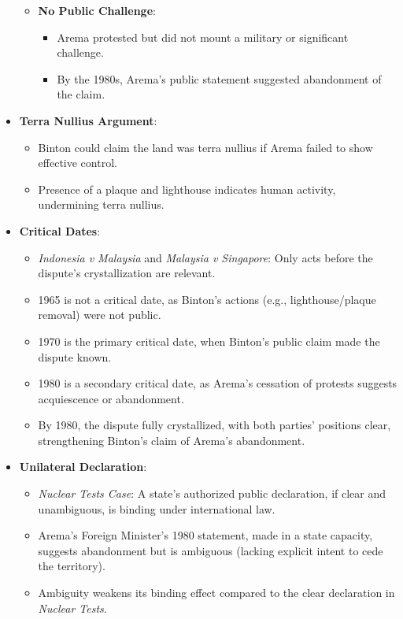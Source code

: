 \begin{itemize}
\begin{itemize}
        \item \textbf{No Public Challenge}:
        \begin{itemize}
            \item Arema protested but did not mount a military or significant challenge.
            \item By the 1980s, Arema’s public statement suggested abandonment of the claim.
        \end{itemize}
    \end{itemize}
    \item \textbf{Terra Nullius Argument}:
    \begin{itemize}
        \item Binton could claim the land was terra nullius if Arema failed to show effective control.
        \item Presence of a plaque and lighthouse indicates human activity, undermining terra nullius.
    \end{itemize}
    \item \textbf{Critical Dates}:
    \begin{itemize}
        \item \textit{Indonesia v Malaysia} and \textit{Malaysia v Singapore}: Only acts before the dispute’s crystallization are relevant.
        \item 1965 is not a critical date, as Binton’s actions (e.g., lighthouse/plaque removal) were not public.
        \item 1970 is the primary critical date, when Binton’s public claim made the dispute known.
        \item 1980 is a secondary critical date, as Arema’s cessation of protests suggests acquiescence or abandonment.
        \item By 1980, the dispute fully crystallized, with both parties’ positions clear, strengthening Binton’s claim of Arema’s abandonment.
    \end{itemize}
    \item \textbf{Unilateral Declaration}:
    \begin{itemize}
        \item \textit{Nuclear Tests Case}: A state’s authorized public declaration, if clear and unambiguous, is binding under international law.
        \item Arema’s Foreign Minister’s 1980 statement, made in a state capacity, suggests abandonment but is ambiguous (lacking explicit intent to cede the territory).
        \item Ambiguity weakens its binding effect compared to the clear declaration in \textit{Nuclear Tests}.
    \end{itemize}
\end{itemize}

